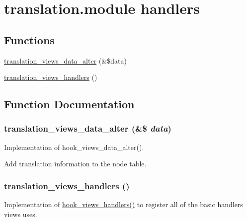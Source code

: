 \hypertarget{group__views__translation__module}{
\section{translation.module handlers}
\label{group__views__translation__module}
}
\subsection*{Functions}
\begin{CompactItemize}
\item 
\hyperlink{group__views__translation__module_gf5cdf5632190e288ac0d9518db433711}{translation\_\-views\_\-data\_\-alter} (\&\$data)
\item 
\hyperlink{group__views__translation__module_g4e32eaff4e1c53238abae68535407583}{translation\_\-views\_\-handlers} ()
\end{CompactItemize}


\subsection{Function Documentation}
\hypertarget{group__views__translation__module_gf5cdf5632190e288ac0d9518db433711}{
\subsubsection[{translation\_\-views\_\-data\_\-alter}]{\setlength{\rightskip}{0pt plus 5cm}translation\_\-views\_\-data\_\-alter (\&\$ {\em data})}}
\label{group__views__translation__module_gf5cdf5632190e288ac0d9518db433711}


Implementation of hook\_\-views\_\-data\_\-alter().

Add translation information to the node table. \hypertarget{group__views__translation__module_g4e32eaff4e1c53238abae68535407583}{
\subsubsection[{translation\_\-views\_\-handlers}]{\setlength{\rightskip}{0pt plus 5cm}translation\_\-views\_\-handlers ()}}
\label{group__views__translation__module_g4e32eaff4e1c53238abae68535407583}


Implementation of \hyperlink{group__views__hooks_gbf506f44bd8d8a86876f27396f5341ed}{hook\_\-views\_\-handlers()} to register all of the basic handlers views uses. 